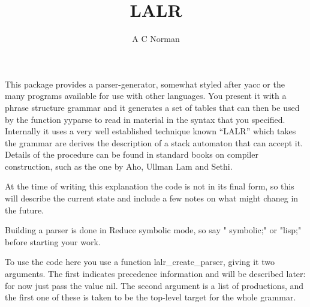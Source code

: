 \documentclass{article}
\title{LALR}
\author{A C Norman}
\begin{document}
This package provides a parser-generator, somewhat styled after
{\ttfamily yacc} or the many programs available for use with other
languages. You present it with a phrase structure grammar and it
generates a set of tables that can then be used by the function
{\ttfamily yyparse} to read in material in the syntax that you specified.
Internally it uses a very well established technique known ``LALR'' which
takes the grammar are derives the description of a stack automaton that
can accept it. Details of the procedure can be found in standard books
on compiler construction, such as the one by Aho, Ullman Lam and Sethi.

At the time of writing this explanation the code is not in its final form,
so this will describe the current state and include a few notes on what
might chaneg in the future.

Building a parser is done in Reduce symbolic mode, so say "{\ttfamily
symbolic;}" or "{\ttfamily lisp;}" before starting your work.

To use the code here you use a function {\ttfamily lalr\_create\_parser},
giving it two arguments. The first indicates precedence information and
will be described later: for now just pass the value {\ttfamily nil}.
The second argument is a list of productions, and the first one of these
is taken to be the top-level target for the whole grammar.
\end{document}
